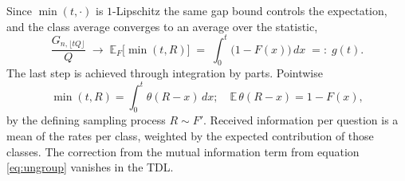 \documentclass[11pt]{article}
\begin{document}
Since $\min(t,\cdot)$ is $1$-Lipschitz the same gap bound controls the
expectation, and the class
average converges to an average over the statistic,
%
\begin{equation}
  \frac{G_{n,\lfloor tQ\rfloor}}{Q}
  \;\longrightarrow\;
  \mathbb E_F\big[\min(t, R)\big]
  \;=\; \int_0^t \big(1 - F(x)\big)\, dx \;=:\; g(t).
  \label{eq:gF}
\end{equation}
%
The last step is achieved through integration by parts. Pointwise
%
\begin{equation}
  \min(t,R) = \int_0^t \theta(R - x)\,dx;\quad \mathbb E\,\theta(R - x) = 1 - F(x),
\end{equation}
by the defining sampling process $R \sim F'$.
Received information per question is a mean of the rates per class, weighted by the expected contribution of those classes. 
The correction from the mutual information term from equation \eqref{eq:ungroup} vanishes in the TDL.
\end{document}
